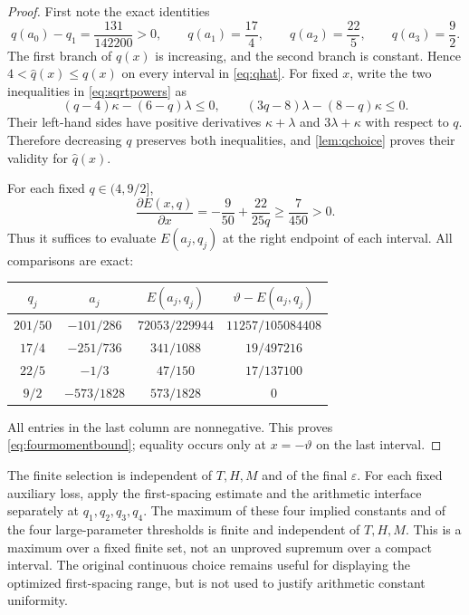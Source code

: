 \documentclass[11pt,reqno]{amsart}
\numberwithin{equation}{section}
\theoremstyle{definition}
\theoremstyle{remark}
\newcommand{\eps}{\varepsilon}
\newcommand{\vth}{\vartheta}
\begin{document}
\begin{proof}
First note the exact identities
\[
 q(a_0)-q_1=\frac{131}{142200}>0,
 \qquad q(a_1)=\frac{17}{4},\qquad q(a_2)=\frac{22}{5},
 \qquad q(a_3)=\frac92.
\]
The first branch of $q(x)$ is increasing, and the second branch is constant.
Hence $4<\widehat q(x)\le q(x)$ on every interval in \eqref{eq:qhat}.
For fixed $x$, write the two inequalities in \eqref{eq:sqrtpowers} as
\[
 (q-4)\kappa-(6-q)\lambda\le0,
 \qquad
 (3q-8)\lambda-(8-q)\kappa\le0.
\]
Their left-hand sides have positive derivatives $\kappa+\lambda$ and $3\lambda+\kappa$ with respect to $q$.
Therefore decreasing $q$ preserves both inequalities, and \cref{lem:qchoice} proves their validity for $\widehat q(x)$.

For each fixed $q\in(4,9/2]$,
\[
 \frac{\partial E(x,q)}{\partial x}
 =-\frac9{50}+\frac{22}{25q}
 \ge\frac7{450}>0.
\]
Thus it suffices to evaluate $E(a_j,q_j)$ at the right endpoint of each interval.
All comparisons are exact:
\begin{center}
\renewcommand{\arraystretch}{1.6}
\begin{tabular}{@{}cccc@{}}
\toprule
$q_j$ & $a_j$ & $E(a_j,q_j)$ & $\vth-E(a_j,q_j)$\\
\midrule
$201/50$ & $-101/286$ & $72053/229944$ & $11257/105084408$\\
$17/4$ & $-251/736$ & $341/1088$ & $19/497216$\\
$22/5$ & $-1/3$ & $47/150$ & $17/137100$\\
$9/2$ & $-573/1828$ & $573/1828$ & $0$\\
\bottomrule
\end{tabular}
\end{center}
All entries in the last column are nonnegative.
This proves \eqref{eq:fourmomentbound}; equality occurs only at $x=-\vth$ on the last interval.
\end{proof}

The finite selection is independent of $T,H,M$ and of the final $\eps$.
For each fixed auxiliary loss, apply the first-spacing estimate and the arithmetic interface separately at $q_1,q_2,q_3,q_4$.
The maximum of these four implied constants and of the four large-parameter thresholds is finite and independent of $T,H,M$.
This is a maximum over a fixed finite set, not an unproved supremum over a compact interval.
The original continuous choice remains useful for displaying the optimized first-spacing range, but is not used to justify arithmetic constant uniformity.
\end{document}
